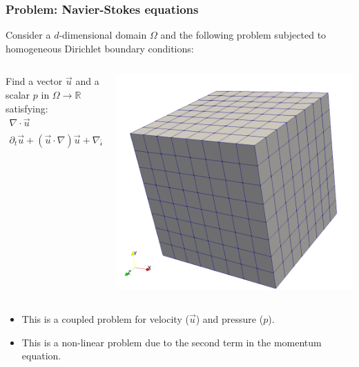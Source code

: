 \begin{frame}
	\frametitle{\textbf{Problem: Navier-Stokes equations}}
	
	Consider a $d$-dimensional domain $\Omega$ and the following problem subjected to homogeneous Dirichlet boundary conditions: 
	\begin{columns}[c]
		\begin{column}{0.5\textwidth}
			\begin{framed}
				Find a vector $\vec{u}$ and a scalar $p$ in $\Omega \rightarrow \mathbb{R}$ satisfying:
				\begin{align*}
					\nabla \cdot \vec{u} &= 0 \\
					\partial_{t} \vec{u} + (\vec{u} \cdot \nabla) \vec{u} + \nabla p - \nu \Delta \vec{u} - \vec{f} &= 0
				\end{align*}
			\end{framed}
		\end{column}
		\begin{column}{0.4\textwidth}
			\vspace*{-\baselineskip}
			\begin{center}
				\includegraphics[scale = 0.13]{images/domain_3d.png}
			\end{center}
		\end{column}
	\end{columns}
	
	\vspace{0.4cm}
	\begin{itemize}
		\item This is a coupled problem for velocity ($\vec{u}$) and pressure ($p$).
		\item This is a non-linear problem due to the second term in the momentum equation.
	\end{itemize}    
\end{frame}
	


